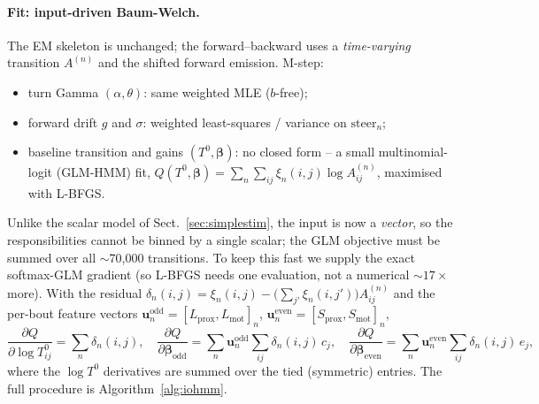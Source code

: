 \documentclass[11pt]{article}
\begin{document}
\paragraph{Fit: input-driven Baum-Welch.}
The EM skeleton is unchanged; the forward--backward uses a \emph{time-varying}
transition $A^{(n)}$ and the shifted forward emission. M-step:
\begin{itemize}[nosep]
  \item turn Gamma $(\alpha,\theta)$: same weighted MLE ($b$-free);
  \item forward drift $g$ and $\sigma$: weighted least-squares / variance on
        $\text{steer}_n$;
  \item baseline transition and gains $(T^0,\boldsymbol\beta)$: no closed form --
        a small multinomial-logit (GLM-HMM) fit,
        $Q(T^0,\boldsymbol\beta)=\sum_n\sum_{ij}\xi_n(i,j)\log A^{(n)}_{ij}$,
        maximised with L-BFGS.
\end{itemize}
Unlike the scalar model of Sect.~\ref{sec:simplestim}, the input is now a
\emph{vector}, so the responsibilities cannot be binned by a single scalar; the
GLM objective must be summed over all $\sim$70{,}000 transitions. To keep this
fast we supply the exact softmax-GLM gradient (so L-BFGS needs one evaluation,
not a numerical $\sim\!17\times$ more). With the residual
$\delta_n(i,j)=\xi_n(i,j)-\big(\sum_{j'}\xi_n(i,j')\big)A^{(n)}_{ij}$ and the
per-bout feature vectors $\mathbf u^{\text{odd}}_n=[L_{\text{prox}},L_{\text{mot}}]_n$,
$\mathbf u^{\text{even}}_n=[S_{\text{prox}},S_{\text{mot}}]_n$,
\begin{equation}
\frac{\partial Q}{\partial\log T^0_{ij}}=\sum_n\delta_n(i,j),\quad
\frac{\partial Q}{\partial\boldsymbol\beta_{\text{odd}}}
   =\sum_n\mathbf u^{\text{odd}}_n\!\!\sum_{ij}\delta_n(i,j)\,c_j,\quad
\frac{\partial Q}{\partial\boldsymbol\beta_{\text{even}}}
   =\sum_n\mathbf u^{\text{even}}_n\!\!\sum_{ij}\delta_n(i,j)\,e_j,
\end{equation}
where the $\log T^0$ derivatives are summed over the tied (symmetric) entries.
The full procedure is Algorithm~\ref{alg:iohmm}.
\end{document}
